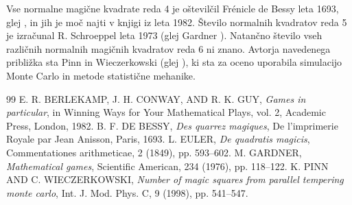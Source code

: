 \documentclass[a4paper,12pt]{article}
\begin{document}

Vse normalne magične kvadrate reda 4 je oštevilčil Frénicle de Bessy
leta 1693, glej \cite{bessy}, in jih je moč najti v knjigi \cite{berlekamp}
iz leta 1982. Število normalnih kvadratov reda 5 je izračunal
R. Schroeppel leta 1973 (glej Gardner \cite{gardner}).
Natančno število vseh različnih normalnih magičnih kvadratov reda 6 ni znano.
Avtorja navedenega približka sta Pinn in Wieczerkowski (glej \cite{pinn}), ki
sta za oceno uporabila simulacijo Monte Carlo in metode statistične mehanike.


\newpage

\begin{thebibliography}{99}
 E. R. BERLEKAMP, J. H. CONWAY, AND R. K. GUY, \emph{Games in particular}, in Winning Ways for Your Mathematical Plays, vol. 2, Academic Press, London, 1982.
 B. F. DE BESSY, \emph{Des quarrez magiques}, De l'imprimerie Royale par Jean Anisson, Paris, 1693.
 L. EULER, \emph{De quadratis magicis}, Commentationes arithmeticae, 2 (1849), pp. 593--602.
 M. GARDNER, \emph{Mathematical games}, Scientific American, 234 (1976), pp. 118--122.
 K. PINN AND C. WIECZERKOWSKI, \emph{Number of magic squares from parallel tempering monte carlo}, Int. J. Mod. Phys. C, 9 (1998), pp. 541--547.
\end{thebibliography}

\end{document}
